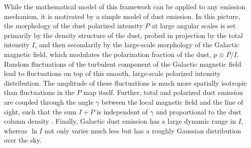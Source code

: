 \documentclass[twocolumn]{aastex631}
\newcommand{\af}[1]{\textcolor{blue}{#1}}
\begin{document}
While the mathematical model of this framework can be applied to any emission mechanism, it is motivated by a simple model of dust emission. In this picture, the morphology of the dust polarized intensity $P$ at large angular scales is set primarily by the density structure of the dust, probed in projection by the total intensity $I$, and then secondarily by the large-scale morphology of the Galactic magnetic field, which modulates the polarization fraction of the dust, $p \equiv P/I$. Random fluctuations of the turbulent component of the Galactic magnetic field lead to fluctuations on top of this smooth, large-scale polarized intensity distribution. The amplitude of these fluctuations is much more spatially isotropic than fluctuations in the $P$ map itself. Further, total and polarized dust emission are coupled through the angle $\gamma$ between the local magnetic field and the line of sight, such that the sum $I+P$ is independent of $\gamma$ and proportional to the dust column density \citep{Hensley:2019}. Finally, Galactic dust emission has a large dynamic range in $I$, whereas $\ln I$ not only varies much less but has a roughly Gaussian distribution over the sky.


\end{document}
